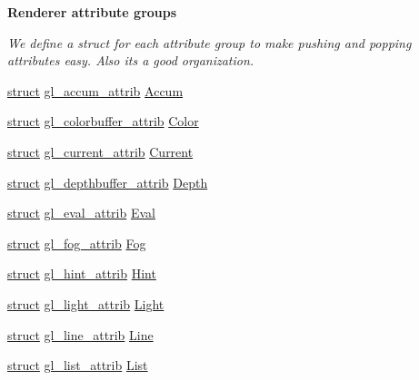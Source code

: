 \begin{Indent}\textbf{ Renderer attribute groups}\par
{\em We define a struct for each attribute group to make pushing and popping attributes easy. Also it\textquotesingle{}s a good organization. }\begin{DoxyCompactItemize}
\item 
\hyperlink{interfacestruct}{struct} \hyperlink{structgl__accum__attrib}{gl\+\_\+accum\+\_\+attrib} \hyperlink{structgl__context_a6d3fc098c5d88af7112008dbc571d1ef}{Accum}
\item 
\hyperlink{interfacestruct}{struct} \hyperlink{structgl__colorbuffer__attrib}{gl\+\_\+colorbuffer\+\_\+attrib} \hyperlink{structgl__context_afab0d7d7836d09a81558ccf9a56e024d}{Color}
\item 
\hyperlink{interfacestruct}{struct} \hyperlink{structgl__current__attrib}{gl\+\_\+current\+\_\+attrib} \hyperlink{structgl__context_a7e896ebbbbd9fccb431e2b177e87229a}{Current}
\item 
\hyperlink{interfacestruct}{struct} \hyperlink{structgl__depthbuffer__attrib}{gl\+\_\+depthbuffer\+\_\+attrib} \hyperlink{structgl__context_a1e53e365f8c2e4b1677d37421fe3ab1e}{Depth}
\item 
\hyperlink{interfacestruct}{struct} \hyperlink{structgl__eval__attrib}{gl\+\_\+eval\+\_\+attrib} \hyperlink{structgl__context_a5f15d1a9ccf2fb8b9ee69a650917a0b2}{Eval}
\item 
\hyperlink{interfacestruct}{struct} \hyperlink{structgl__fog__attrib}{gl\+\_\+fog\+\_\+attrib} \hyperlink{structgl__context_af8949f54ba019939b7eebc1200aaec78}{Fog}
\item 
\hyperlink{interfacestruct}{struct} \hyperlink{structgl__hint__attrib}{gl\+\_\+hint\+\_\+attrib} \hyperlink{structgl__context_a7ac77ff692912136a0fb6703e1bb863c}{Hint}
\item 
\hyperlink{interfacestruct}{struct} \hyperlink{structgl__light__attrib}{gl\+\_\+light\+\_\+attrib} \hyperlink{structgl__context_a5f080158d18983d21aa97cc694bdaefb}{Light}
\item 
\hyperlink{interfacestruct}{struct} \hyperlink{structgl__line__attrib}{gl\+\_\+line\+\_\+attrib} \hyperlink{structgl__context_a650b57ea969135a891cccfed705c9685}{Line}
\item 
\hyperlink{interfacestruct}{struct} \hyperlink{structgl__list__attrib}{gl\+\_\+list\+\_\+attrib} \hyperlink{structgl__context_a57a14cd1572a6d337817ad2934bf1fac}{List}
\item 
\mbox{\label{structgl__context_a61c5e0d659d8c8a9d86608e7d907c57f}} 

\end{DoxyCompactItemize}
\end{Indent}
